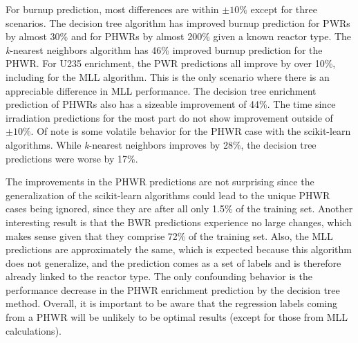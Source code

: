For burnup prediction, most differences are within $\pm10\%$ except for three
scenarios.  The decision tree algorithm has improved burnup prediction for
\gls{PWR}s by almost 30\% and for \gls{PHWR}s by almost 200\% given a known
reactor type.  The \textit{k}-nearest neighbors algorithm has 46\% improved
burnup prediction for the \gls{PHWR}. For \gls{U235} enrichment, the \gls{PWR}
predictions all improve by over 10\%, including for the \gls{MLL} algorithm.
This is the only scenario where there is an appreciable difference in \gls{MLL}
performance. The decision tree enrichment prediction of \gls{PHWR}s also has a
sizeable improvement of 44\%.  The time since irradiation predictions for the
most part do not show improvement outside of $\pm10\%$. Of note is some
volatile behavior for the \gls{PHWR} case with the scikit-learn algorithms.
While \textit{k}-nearest neighbors improves by 28\%, the decision tree
predictions were worse by 17\%.

The improvements in the \gls{PHWR} predictions are not surprising since the
generalization of the scikit-learn algorithms could lead to the unique
\gls{PHWR} cases being ignored, since they are after all only 1.5\% of the
training set.  Another interesting result is that the \gls{BWR} predictions
experience no large changes, which makes sense given that they comprise 72\% of
the training set. Also, the \gls{MLL} predictions are approximately the same,
which is expected because this algorithm does not generalize, and the
prediction comes as a set of labels and is therefore already linked to the
reactor type.  The only confounding behavior is the performance decrease in the
\gls{PHWR} enrichment prediction by the decision tree method.  Overall, it is
important to be aware that the regression labels coming from a \gls{PHWR} will
be unlikely to be optimal results (except for those from \gls{MLL}
calculations).

